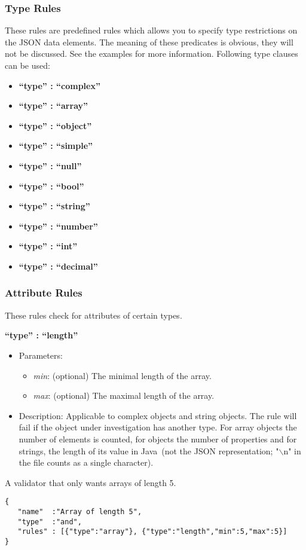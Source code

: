 \documentclass[a4paper]{article}
\newcommand{\ruledef}[3]{
\medskip
\textbf{#1}

\begin{itemize}
\setlength{\itemsep}{1pt}
\setlength{\parskip}{0pt}
\setlength{\parsep}{0pt}
   \item Parameters: #2
   \item Description: #3
\end{itemize}
}
\newcommand{\rulename}[1]{\textbf{``type'' : ``#1''}}
\newcommand{\java}{Java}
\newcommand{\param}[1]{\textsl{#1}:}
\begin{document}
\subsubsection{Type Rules }

These rules are predefined rules which allows you to specify type restrictions on the JSON data elements. The meaning of these predicates is obvious, they will not be discussed. See the examples for more information. Following type clauses can be used: 

\begin{itemize}
\setlength{\itemsep}{1pt}
\setlength{\parskip}{0pt}
\setlength{\parsep}{0pt}
   \item  \rulename{complex}
   \item  \rulename{array}
   \item  \rulename{object}
   \item  \rulename{simple}
   \item  \rulename{null}
   \item  \rulename{bool}
   \item  \rulename{string}
   \item  \rulename{number}
   \item  \rulename{int}
   \item  \rulename{decimal}
\end{itemize}

\subsubsection{ Attribute Rules }

These rules check for attributes of certain types.

\ruledef{\rulename{length}}{
\begin{itemize}
   \item \param{min} (optional) The minimal length of the array.
   \item \param{max} (optional) The maximal length of the array.
\end{itemize}} {
Applicable to complex objects and string objects. The rule will fail if the object under investigation has another type. For array objects the number of elements is counted, for objects the number of properties and for strings, the length of its value in \java\ (not the JSON representation; "$\backslash$n" in the file counts as a single character).}

A validator that only wants arrays of length 5.
\begin{lstlisting}
{
   "name"  :"Array of length 5",
   "type"  :"and",
   "rules" : [{"type":"array"}, {"type":"length","min":5,"max":5}]
}
\end{lstlisting}
\end{document}
